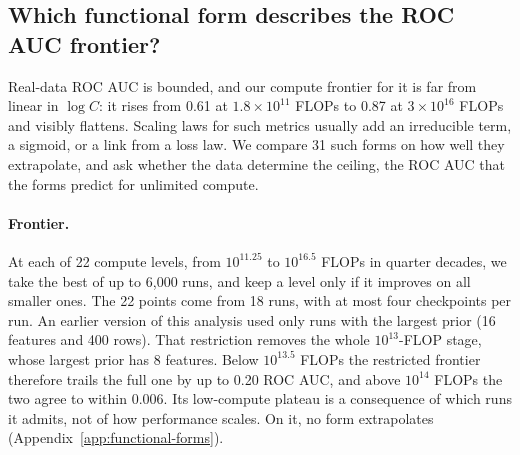 
\subsection{Which functional form describes the ROC AUC frontier?}
\label{sec:functional-forms}

Real-data ROC AUC is bounded, and our compute frontier for it is far from linear in $\log C$: it rises from 0.61 at
$1.8\times10^{11}$ FLOPs to 0.87 at $3\times10^{16}$ FLOPs and visibly flattens. Scaling laws for such metrics usually add
an irreducible term, a sigmoid, or a link from a loss law. We compare 31 such forms on how well they extrapolate, and ask
whether the data determine the ceiling, the ROC AUC that the forms predict for unlimited compute.

\paragraph{Frontier.}
At each of 22 compute levels, from $10^{11.25}$ to $10^{16.5}$ FLOPs in quarter decades, we take the best of up to
6{,}000 runs, and keep a level only if it improves on all smaller ones. The 22 points come from 18 runs, with at most four
checkpoints per run. An earlier version of this analysis used only runs with the largest prior (16 features and 400
rows). That restriction removes the whole $10^{13}$-FLOP stage, whose largest prior has 8 features. Below $10^{13.5}$
FLOPs the restricted frontier therefore trails the full one by up to 0.20 ROC AUC, and above $10^{14}$ FLOPs the two
agree to within 0.006. Its low-compute plateau is a consequence of which runs it admits, not of how performance scales.
On it, no form extrapolates (Appendix~\ref{app:functional-forms}).

